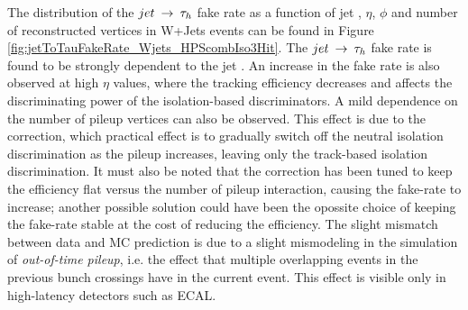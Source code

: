 The distribution of the $jet \:\rightarrow\: \tau_h$ fake rate as a function of jet \pT, $\eta$, $\phi$ and number of reconstructed vertices in W+Jets events can be found in Figure \ref{fig:jetToTauFakeRate_Wjets_HPScombIso3Hit}. The $jet \:\rightarrow\: \tau_h$ fake rate is found to be strongly dependent to the jet \pT. An increase in the fake rate is also observed at high $\eta$ values, where the tracking efficiency decreases and affects the discriminating power of the isolation-based discriminators. A mild dependence on the number of pileup vertices can also be observed. This effect is due to the \db correction, which practical effect is to gradually switch off the neutral isolation discrimination as the pileup increases, leaving only the track-based isolation discrimination. It must also be noted that the \db correction has been tuned to keep the efficiency flat versus the number of pileup interaction, causing the fake-rate to increase; another possible solution could have been the opossite choice of keeping the fake-rate stable at the cost of reducing the efficiency. The slight mismatch between data and MC prediction is due to a slight mismodeling in the simulation of \emph{out-of-time pileup}, i.e. the effect that multiple overlapping events in the previous bunch crossings have in the current event. This effect is visible only in high-latency detectors such as ECAL.

